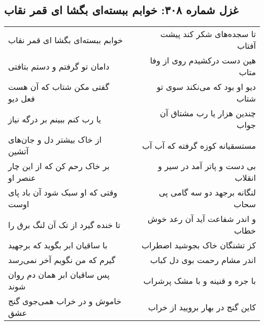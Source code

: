 \begin{center}
\section*{غزل شماره ۳۰۸: خوابم ببسته‌ای بگشا ای قمر نقاب}
\label{sec:0308}
\begin{longtable}{l p{0.5cm} r}
خوابم ببسته‌ای بگشا ای قمر نقاب
&&
تا سجده‌های شکر کند پیشت آفتاب
\\
دامان تو گرفتم و دستم بتافتی
&&
هین دست درکشیدم روی از وفا متاب
\\
گفتی مکن شتاب که آن هست فعل دیو
&&
دیو او بود که می‌نکند سوی تو شتاب
\\
یا رب کنم ببینم بر درگه نیاز
&&
چندین هزار یا رب مشتاق آن جواب
\\
از خاک بیشتر دل و جان‌های آتشین
&&
مستسقیانه کوزه گرفته که آب آب
\\
بر خاک رحم کن که از این چار عنصر او
&&
بی دست و پاتر آمد در سیر و انقلاب
\\
وقتی که او سبک شود آن باد پای اوست
&&
لنگانه برجهد دو سه گامی پی سحاب
\\
تا خنده گیرد از تک آن لنگ برق را
&&
و اندر شفاعت آید آن رعد خوش خطاب
\\
با ساقیان ابر بگوید که برجهید
&&
کز تشنگان خاک بجوشید اضطراب
\\
گیرم که من نگویم آخر نمی‌رسد
&&
اندر مشام رحمت بوی دل کباب
\\
پس ساقیان ابر همان دم روان شوند
&&
با جره و قنینه و با مشک پرشراب
\\
خاموش و در خراب همی‌جوی گنج عشق
&&
کاین گنج در بهار برویید از خراب
\\
\end{longtable}
\end{center}
